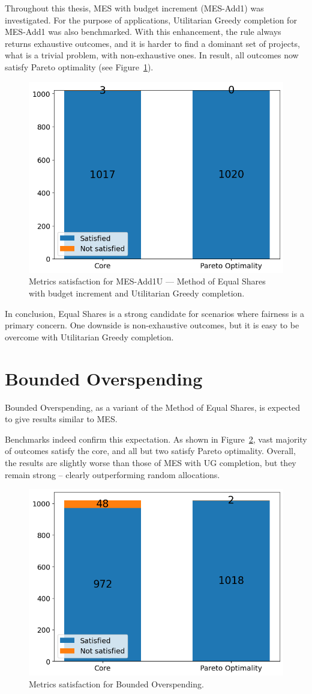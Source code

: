 \documentclass[magisterska,en]{pracamgr}
\begin{document}
Throughout this thesis, MES with budget increment (MES-Add1) was investigated. For the purpose of applications, Utilitarian Greedy completion for MES-Add1 was also benchmarked. With this enhancement, the rule always returns exhaustive outcomes, and it is harder to find a dominant set of projects, what is a trivial problem, with non-exhaustive ones. In result, all outcomes now satisfy Pareto optimality (see Figure~\ref{mes-ug-metrics}).

\begin{figure}[h!]
    \centering
    \includegraphics[width=0.46\linewidth]{outputs/MetricSatisfaction/mes-ug.png}
    \caption{Metrics satisfaction for MES-Add1U --- Method of Equal Shares with budget increment and Utilitarian Greedy completion.}
    \label{mes-ug-metrics}
\end{figure}

In conclusion, Equal Shares is a strong candidate for scenarios where fairness is a primary concern. One downside is non-exhaustive outcomes, but it is easy to be overcome with Utilitarian Greedy completion.

\section{Bounded Overspending}

Bounded Overspending, as a variant of the Method of Equal Shares, is expected to give results similar to MES.

Benchmarks indeed confirm this expectation. As shown in Figure~\ref{bos-metrics}, vast majority of outcomes satisfy the core, and all but two satisfy Pareto optimality. Overall, the results are slightly worse than those of MES with UG completion, but they remain strong -- clearly outperforming random allocations.

\begin{figure}[h!]
    \centering
    \includegraphics[width=0.46\linewidth]{outputs/MetricSatisfaction/bos.png}
    \caption{Metrics satisfaction for Bounded Overspending.}
    \label{bos-metrics}
\end{figure}
\end{document}
